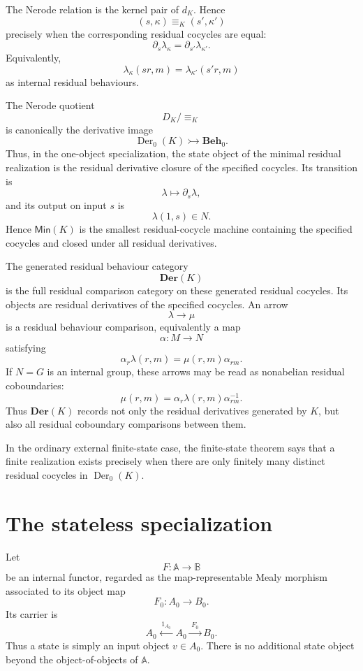 The Nerode relation is the kernel pair of \(d_K\). Hence
\[
    (s,\kappa)\equiv_K(s',\kappa')
\]
precisely when the corresponding residual cocycles are equal:
\[
    \partial_s\lambda_\kappa
    =
    \partial_{s'}\lambda_{\kappa'}.
\]
Equivalently,
\[
    \lambda_\kappa(sr,m)
    =
    \lambda_{\kappa'}(s'r,m)
\]
as internal residual behaviours.

The Nerode quotient
\[
    D_K/{\equiv_K}
\]
is canonically the derivative image
\[
    \operatorname{Der}_0(K)\rightarrowtail\mathbf{Beh}_0.
\]
Thus, in the one-object specialization, the state object of the minimal
residual realization is the residual derivative closure of the specified
cocycles. Its transition is
\[
    \lambda\longmapsto\partial_s\lambda,
\]
and its output on input \(s\) is
\[
    \lambda(1,s)\in N.
\]
Hence \(\mathsf{Min}(K)\) is the smallest residual-cocycle machine containing
the specified cocycles and closed under all residual derivatives.

The generated residual behaviour category
\[
    \mathbf{Der}(K)
\]
is the full residual comparison category on these generated residual cocycles.
Its objects are residual derivatives of the specified cocycles. An arrow
\[
    \lambda\to\mu
\]
is a residual behaviour comparison, equivalently a map
\[
    \alpha:M\to N
\]
satisfying
\[
    \alpha_r\lambda(r,m)=\mu(r,m)\alpha_{rm}.
\]
If \(N=G\) is an internal group, these arrows may be read as nonabelian
residual coboundaries:
\[
    \mu(r,m)=\alpha_r\lambda(r,m)\alpha_{rm}^{-1}.
\]
Thus \(\mathbf{Der}(K)\) records not only the residual derivatives generated by
\(K\), but also all residual coboundary comparisons between them.

In the ordinary external finite-state case, the finite-state theorem says that
a finite realization exists precisely when there are only finitely many
distinct residual cocycles in \(\operatorname{Der}_0(K)\).

\section{The stateless specialization}
\label{sec:behaviour-stateless-specialization}

Let
\[
    F:\mathbb A\to\mathbb B
\]
be an internal functor, regarded as the map-representable Mealy morphism
associated to its object map
\[
    F_0:A_0\to B_0.
\]
Its carrier is
\[
    A_0
        \xleftarrow{\;1_{A_0}\;}
    A_0
        \xrightarrow{\;F_0\;}
    B_0.
\]
Thus a state is simply an input object \(v\in A_0\). There is no additional
state object beyond the object-of-objects of \(\mathbb A\).

